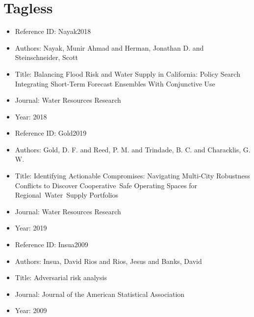 \documentclass[11pt]{article}
\begin{document}
\section{Tagless} 
\noindent\citep{Nayak2018} 
\begin{itemize} 
\item{Reference ID:  Nayak2018} 

\item{Authors:  Nayak, Munir Ahmad and Herman, Jonathan D. and Steinschneider, Scott} 

\item{Title:  Balancing Flood Risk and Water Supply in California: Policy Search Integrating Short-Term Forecast Ensembles With Conjunctive Use} 

\item{Journal:  Water Resources Research} 

\item{Year:  2018} 

\end{itemize}\medskip



\noindent\citep{Gold2019} 
\begin{itemize} 
\item{Reference ID:  Gold2019} 

\item{Authors:  Gold, D. F. and Reed, P. M. and Trindade, B. C. and Characklis, G. W.} 

\item{Title:  Identifying Actionable Compromises: Navigating Multi-City Robustness Conflicts to Discover Cooperative Safe Operating Spaces for Regional Water Supply Portfolios} 

\item{Journal:  Water Resources Research} 

\item{Year:  2019} 

\end{itemize}\medskip



\noindent\citep{Insua2009} 
\begin{itemize} 
\item{Reference ID:  Insua2009} 

\item{Authors:  Insua, David Rios and Rios, Jesus and Banks, David} 

\item{Title:  Adversarial risk analysis} 

\item{Journal:  Journal of the American Statistical Association} 

\item{Year:  2009} 

\end{itemize}\medskip




 
\end{document}

